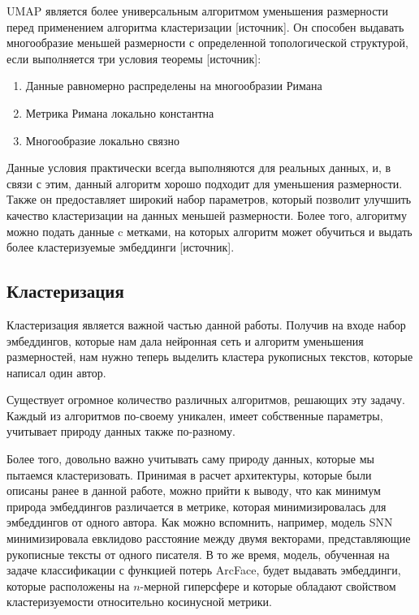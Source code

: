 UMAP является более универсальным алгоритмом уменьшения размерности перед применением алгоритма кластеризации [источник]. Он способен выдавать многообразие меньшей размерности с определенной топологической структурой, если выполняется три условия теоремы [источник]:

\begin{enumerate}
    \item Данные равномерно распределены на многообразии Римана
    \item Метрика Римана локально константна
    \item Многообразие локально связно 
\end{enumerate}

Данные условия практически всегда выполняются для реальных данных, и, в связи с этим, данный алгоритм хорошо подходит для уменьшения размерности. Также он предоставляет широкий набор параметров, который позволит улучшить качество кластеризации на данных меньшей размерности. Более того, алгоритму можно подать данные c метками, на которых алгоритм может обучиться и выдать более кластеризуемые эмбеддинги [источник].

\subsection{Кластеризация}

Кластеризация является важной частью данной работы. Получив на входе набор эмбеддингов, которые нам дала нейронная сеть и алгоритм уменьшения размерностей, нам нужно теперь выделить кластера рукописных текстов, которые написал один автор. 

Существует огромное количество различных алгоритмов, решающих эту задачу. Каждый из алгоритмов по-своему уникален, имеет собственные параметры, учитывает природу данных также по-разному. 

Более того, довольно важно учитывать саму природу данных, которые мы пытаемся кластеризовать. Принимая в расчет архитектуры, которые были описаны ранее в данной работе, можно прийти к выводу, что как минимум природа эмбеддингов различается в метрике, которая минимизировалась для эмбеддингов от одного автора. Как можно вспомнить, например, модель SNN минимизировала евклидово расстояние между двумя векторами, представляющие рукописные тексты от одного писателя. В то же время, модель, обученная на задаче классификации с функцией потерь ArcFace, будет выдавать эмбеддинги, которые расположены на $n$-мерной гиперсфере и которые обладают свойством кластеризуемости относительно косинусной метрики.

